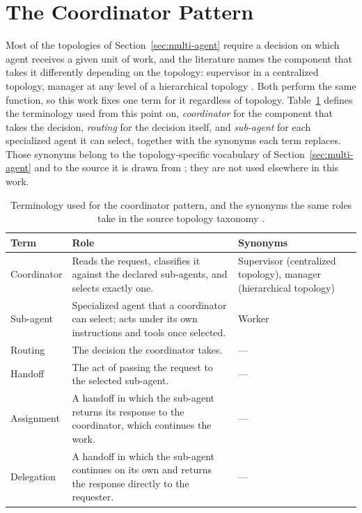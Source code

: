 \section{The Coordinator Pattern}
\label{sec:coordinator}

Most of the topologies of Section~\ref{sec:multi-agent} require a decision on which agent receives a given unit of work, and the literature names the component that takes it differently depending on the topology: supervisor in a centralized topology, manager at any level of a hierarchical topology \cite{zhuLLMBasedMultiAgentOrchestration2026a}. Both perform the same function, so this work fixes one term for it regardless of topology. Table~\ref{tab:coordinator-terms} defines the terminology used from this point on, \emph{coordinator} for the component that takes the decision, \emph{routing} for the decision itself, and \emph{sub-agent} for each specialized agent it can select, together with the synonyms each term replaces. Those synonyms belong to the topology-specific vocabulary of Section~\ref{sec:multi-agent} and to the source it is drawn from \cite{zhuLLMBasedMultiAgentOrchestration2026a}; they are not used elsewhere in this work.

\begin{table}[ht]
	\centering
	\small
	\renewcommand{\arraystretch}{1.4}
	\begin{tabularx}{\textwidth}{@{} l >{\raggedright\arraybackslash}X >{\raggedright\arraybackslash}p{3.1cm} @{}}
		\toprule
		Term & Role & Synonyms \\
		\midrule
		Coordinator & Reads the request, classifies it against the declared sub-agents, and selects exactly one. & Supervisor (centralized topology), manager (hierarchical topology) \\
		Sub-agent & Specialized agent that a coordinator can select; acts under its own instructions and tools once selected. & Worker \\
		Routing & The decision the coordinator takes. & --- \\
		Handoff & The act of passing the request to the selected sub-agent. & --- \\
		Assignment & A handoff in which the sub-agent returns its response to the coordinator, which continues the work. & --- \\
		Delegation & A handoff in which the sub-agent continues on its own and returns the response directly to the requester. & --- \\
		\bottomrule
	\end{tabularx}
	\caption[Terminology used for the coordinator pattern]{Terminology used for the coordinator pattern, and the synonyms the same roles take in the source topology taxonomy \cite{zhuLLMBasedMultiAgentOrchestration2026a}.}
	\label{tab:coordinator-terms}
\end{table}

